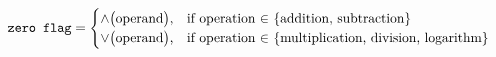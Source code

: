 \begin{align*}
    \texttt{zero flag} & = \begin{cases}
        \text{$\wedge$\big(operand\big),} & \text{if operation $\in$
        \{addition, subtraction\} } \\
        \text{$\vee$\big(operand\big),} & \text{if operation $\in$
        \{multiplication, division, logarithm\} } \\
    \end{cases}
\end{align*}
\newpage
